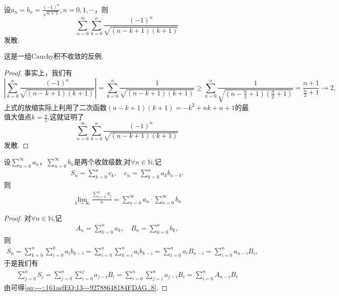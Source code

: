 \documentclass[../../main.tex]{subfiles}%
\begin{document}
\begin{example}
设\(a_n = b_n = \frac{(-1)^n}{\sqrt{n + 1}}, n = 0,1,\cdots\)，则
\[
\sum_{n = 0}^{\infty} \sum_{k = 0}^{n} \frac{(-1)^n}{\sqrt{(n - k + 1)(k + 1)}}
\]
发散.
\end{example}
\begin{remark}
这是一组Cauchy积不收敛的反例.
\end{remark}
\begin{proof}

事实上，我们有
\[
\left| \sum_{k = 0}^{n} \frac{(-1)^n}{\sqrt{(n - k + 1)(k + 1)}} \right| = \sum_{k = 0}^{n} \frac{1}{\sqrt{(n - k + 1)(k + 1)}} \geqslant \sum_{k = 0}^{n} \frac{1}{\sqrt{\left(n - \frac{n}{2} + 1\right)\left(\frac{n}{2} + 1\right)}} = \frac{n + 1}{\frac{n}{2} + 1} \to 2,
\]
上式的放缩实际上利用了二次函数$\left( n-k+1 \right) \left( k+1 \right) =-k^2+nk+n+1$的最值大值点$k=\frac{n}{2}$.这就证明了
\[
\sum_{n = 0}^{\infty} \sum_{k = 0}^{n} \frac{(-1)^n}{\sqrt{(n - k + 1)(k + 1)}}
\]
发散.

\end{proof}

\begin{proposition}\label{proposition:命题3....4}
设\(\sum_{n = 0}^{\infty} a_n\)，\(\sum_{n = 0}^{\infty} b_n\)是两个收敛级数,对$\forall n\in \mathbb{N}$,记
\begin{align*}
S_n = \sum_{k = 0}^{n} c_k,\quad c_n = \sum_{k = 0}^{n} a_k b_{n - k}.
\end{align*}
则
\begin{align}
\lim\limits_{n\to\infty} \frac{\sum\limits_{j=0}^{n} S_j}{n} = \sum\limits_{n=0}^{\infty} a_n \cdot \sum\limits_{n=0}^{\infty} b_n
\label{eq:---::161asfEQ:13---92788648184FDAG..8}
\end{align}
\end{proposition}
\begin{proof}

对$\forall n\in \mathbb{N}$,记
\begin{align*}
A_n = \sum_{k = 0}^{n} a_k,\quad B_n = \sum_{k = 0}^{n} b_k,
\end{align*}
则
\begin{align*}
S_n = \sum\limits_{k=0}^{n} \sum\limits_{i=0}^{k} a_i b_{k-i} = \sum\limits_{i=0}^{n} \sum\limits_{k=i}^{n} a_i b_{k-i} = \sum\limits_{i=0}^{n} a_i B_{n-i} = \sum\limits_{i=0}^{n} a_{n-i} B_i,
\end{align*}
于是我们有
\begin{align*}
\sum\limits_{j=0}^{n} S_j = \sum\limits_{j=0}^{n} \sum\limits_{i=0}^{j} a_{j-i} B_i = \sum\limits_{i=0}^{n} \sum\limits_{j=i}^{n} a_{j-i} B_i = \sum\limits_{i=0}^{n} A_{n-i} B_i
\end{align*}
由可得\eqref{eq:---::161asfEQ:13---92788648184FDAG..8}.

\end{proof}
\end{document}
